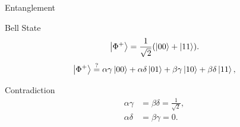         \begin{frame}{Entanglement}
            \begin{center}
                \begin{block}{Bell State}
                    \begin{equation*}
                        \begin{split}
                            \ket{\Phi^+}=
                            \frac{1}{\sqrt{2}}{\left(\ket{00}+
                            \ket{11}\right)}.
                        \end{split}
                    \end{equation*}
                    \begin{equation*}
                        \ket{\Phi^+} \stackrel{?}{=}
                        \alpha \gamma \ket{00}  
                        + \alpha \delta \ket{01} 
                        + \beta \gamma \ket{10}  
                        + \beta \delta \ket{11},
                    \end{equation*}
                \end{block}
                \begin{block}{Contradiction}
                    \begin{equation*}
                        \begin{split}
                            \alpha \gamma  & = \beta \delta = \frac{1}{\sqrt{2}},\\
                            \alpha \delta & = \beta \gamma = 0.
                        \end{split}
                    \end{equation*}
                \end{block}
            \end{center}
        \end{frame}